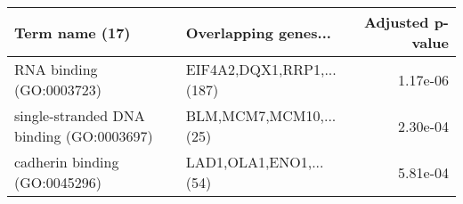 \begin{tabular}{llr}
\toprule
                          Term name (17) &      Overlapping genes... &  Adjusted p-value \\
\midrule
                RNA binding (GO:0003723) & EIF4A2,DQX1,RRP1,...(187) &          1.17e-06 \\
single-stranded DNA binding (GO:0003697) &    BLM,MCM7,MCM10,...(25) &          2.30e-04 \\
           cadherin binding (GO:0045296) &    LAD1,OLA1,ENO1,...(54) &          5.81e-04 \\
\bottomrule
\end{tabular}
